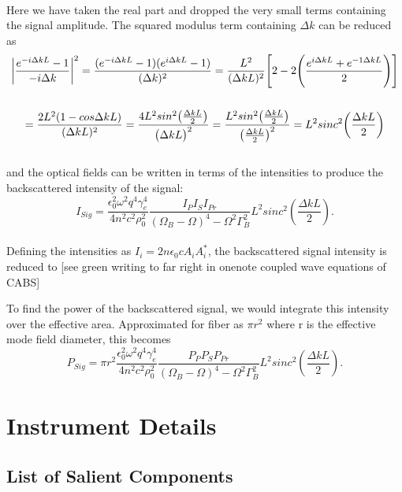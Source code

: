 \documentclass[%
  reprint,
  superscriptaddress,
  amsmath,amssymb,
  aps,
  prapplied,
]{revtex4-2}
\begin{document}
\\
Here we have taken the real part and dropped the very small terms containing the signal amplitude. The squared modulus term containing $\Delta k$ can be reduced as
\\
\begin{gather}
  \bigg|\frac{e^{-i\Delta kL} - 1}{-i\Delta k}\bigg|^{2} = \frac{(e^{-i\Delta kL} - 1)(e^{i\Delta kL} - 1)}{(\Delta k)^{2}} = \frac{L^{2}}{(\Delta kL)^{2}}\Bigg[ 2 - 2\Bigg(\frac{e^{i\Delta kL} + e^{-1\Delta kL}}{2}\Bigg)\Bigg] \notag \\ \notag \\
  = \frac{2L^{2}(1 - cos\Delta kL)}{(\Delta kL)^{2}} = \frac{4L^{2}sin^{2}\big(\frac{\Delta kL}{2}\big)}{\big(\Delta kL\big)^{2}} = \frac{L^{2}sin^{2}\big(\frac{\Delta kL}{2}\big)}{\big(\frac{\Delta kL}{2}\big)^{2}} = L^{2}sinc^{2}\bigg(\frac{\Delta kL}{2}\bigg)
\end{gather}
\\
and the optical fields can be written in terms of the intensities to produce the backscattered intensity of the signal:
\\
\begin{equation}
  I_{Sig} = \frac{\epsilon_{0}^{2}\omega^{2}q^{4}\gamma_{e}^{4}}{4n^{2}c^{2}\rho_{0}^{2}}\frac{I_{P}I_{S}I_{Pr}}{(\Omega_{B} - \Omega)^{4} - \Omega^{2}\Gamma_{B}^{2}}L^{2}sinc^{2}\left(\frac{\Delta kL}{2}\right).
\end{equation}
\\
Defining the intensities as $I_{i} = 2n\epsilon_{0}cA_{i}A_{i}^{*}$, the backscattered signal intensity is reduced to [see green writing to far right in onenote coupled wave equations of CABS]

To find the power of the backscattered signal, we would integrate this intensity over the effective area. Approximated for fiber as $\pi r^{2}$ where r is the effective mode field diameter, this becomes
\\
\begin{equation}
  P_{Sig} = \pi r^{2}\frac{\epsilon_{0}^{2}\omega^{2}q^{4}\gamma_{e}^{4}}{4n^{2}c^{2}\rho_{0}^{2}}\frac{P_{P}P_{S}P_{Pr}}{(\Omega_{B} - \Omega)^{4} - \Omega^{2}\Gamma_{B}^{2}}L^{2}sinc^{2}\left(\frac{\Delta kL}{2}\right).
\end{equation}
\newpage

\section{Instrument Details}
\subsection{List of Salient Components}
\end{document}
